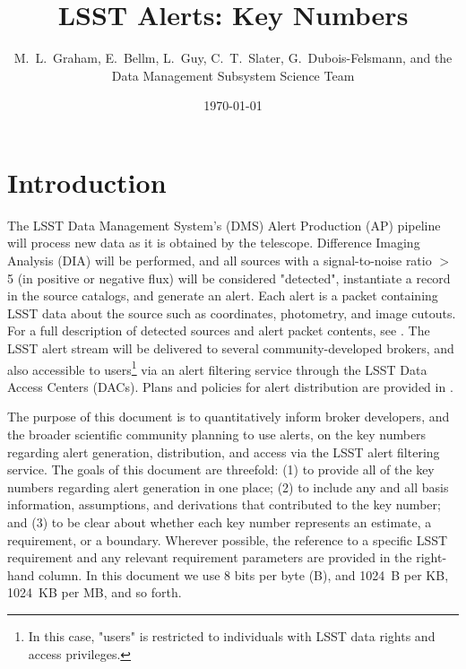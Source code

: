 \documentclass[DM,lsstdraft,authoryear,toc]{lsstdoc}
\title[Alerts Key Numbers]{LSST Alerts: Key Numbers}
\author{%
M.~L.~Graham, E.~Bellm, L.~Guy, C.~T.~Slater, G.~Dubois-Felsmann, and the Data Management Subsystem Science Team
}
\date{\today}
\begin{document}
\maketitle

\section{Introduction} \label{sec:intro}

The LSST Data Management System's (DMS) Alert Production (AP) pipeline will process new data as it is obtained by the telescope. Difference Imaging Analysis (DIA) will be performed, and all sources with a signal-to-noise ratio $>$5 (in positive or negative flux) will be considered "detected", instantiate a record in the source catalogs, and generate an alert. Each alert is a packet containing LSST data about the source such as coordinates, photometry, and image cutouts. For a full description of detected sources and alert packet contents, see . The LSST alert stream will be delivered to several community-developed brokers, and also accessible to users\footnote{In this case, "users" is restricted to individuals with LSST data rights and access privileges.} via an alert filtering service through the LSST Data Access Centers (DACs). Plans and policies for alert distribution are provided in . 

The purpose of this document is to quantitatively inform broker developers, and the broader scientific community planning to use alerts, on the key numbers regarding alert generation, distribution, and access via the LSST alert filtering service. The goals of this document are threefold: (1) to provide all of the key numbers regarding alert generation in one place; (2) to include any and all basis information, assumptions, and derivations that contributed to the key number; and (3) to be clear about whether each key number represents an estimate, a requirement, or a boundary. Wherever possible, the reference to a specific LSST requirement and any relevant requirement parameters are provided in the right-hand column. In this document we use 8 bits per byte (B), and 1024~B per KB, 1024~KB per MB, and so forth.
\end{document}
